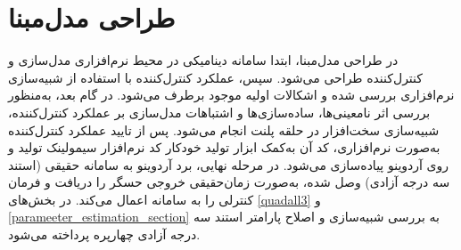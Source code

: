 \section{طراحی مدل‌مبنا}
در طراحی مدل‌مبنا، ابتدا سامانه دینامیكی در محیط نرم‌افزاری مدل‌سازی و کنترل‌کننده طراحی می‌شود. سپس،  عملكرد کنترل‌کننده با استفاده از شبیه‌سازی نرم‌افزاری بررسی شده و اشكالات اولیه موجود برطرف می‌شود. در گام بعد، به‌منظور بررسی اثر نامعینی‌ها، ساده‌سازی‌ها و اشتباهات مدل‌سازی بر عملكرد کنترل‌کننده، شبیه‌سازی سخت‌افزار در حلقه پلنت
انجام می‌شود. پس از تایید عملكرد کنترل‌کننده به‌صورت نرم‌افزاری، کد آن به‌کمک ابزار تولید خودکار کد نرم‌افزار سیمولینک تولید و روی آردوینو پیاده‌سازی می‌شود.
 در مرحله نهایی، برد آردوینو به سامانه حقیقی (استند سه درجه آزادی) وصل شده، به‌صورت
زمان‌حقیقی خروجی حسگر را دریافت و فرمان کنترلی را به سامانه اعمال می‌کند. در بخش‌های
\ref{quadall3}
و
\ref{parameeter_estimation_section}
به بررسی شبیه‌سازی و اصلاح پارامتر استند سه درجه آزادی چهارپره پرداخته می‌شود.
